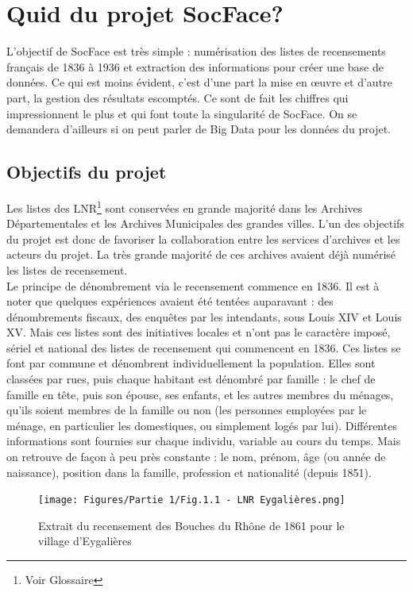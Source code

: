 \chapter{Quid du projet SocFace?}
L’objectif de SocFace est très simple : numérisation des listes de recensements français de 1836 à 1936 et extraction des informations pour créer une base de données. Ce qui est moins évident, c’est d’une part la mise en œuvre et d’autre part, la gestion des résultats escomptés. Ce sont de fait les chiffres qui impressionnent le plus et qui font toute la singularité de SocFace. On se demandera d’ailleurs si on peut parler de Big Data pour les données du projet. 



    \section{Objectifs du projet}

Les listes des \gls{LNR}\footnote{Voir Glossaire} sont conservées en grande majorité dans les Archives Départementales et les Archives Municipales des grandes villes. L’un des objectifs du projet est donc de favoriser la collaboration entre les services d’archives et les acteurs du projet. La très grande majorité de ces archives avaient déjà numérisé les listes de recensement.\\
Le principe de dénombrement via le recensement commence en 1836. Il est à noter que quelques expériences avaient été tentées auparavant : des dénombrements fiscaux, des enquêtes par les intendants, sous Louis XIV et Louis XV. Mais ces listes sont des initiatives locales et n'ont pas le caractère imposé, sériel et national des listes de recensement qui commencent en 1836. Ces listes se font par commune et dénombrent individuellement la population. Elles sont classées par rues, puis chaque habitant est dénombré par famille : le chef de famille en tête, puis son épouse, ses enfants, et les autres membres du ménages, qu’ils soient membres de la famille
ou non (les personnes employées par le ménage, en particulier les domestiques, ou simplement logés par lui). Différentes informations sont fournies sur chaque individu, variable au cours du temps. Mais on retrouve de façon à peu près constante : le nom, prénom, âge (ou année de naissance), position dans la famille, profession et nationalité (depuis 1851).\\
    
    \begin{figure}[H]
        \centering
        \texttt{[image: Figures/Partie 1/Fig.1.1 - LNR Eygalières.png]}
        \caption[Extrait du recensement des Bouches du Rhône - de 1861 pour le village d'Eygalières]{Extrait du recensement des Bouches du Rhône de 1861 pour le village d'Eygalières}
        \label{fig:Fig1.1}
    \end{figure}

